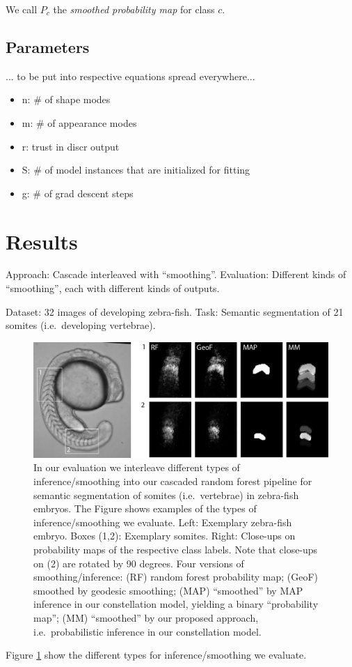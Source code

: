\documentclass[10pt,twocolumn,letterpaper]{article}
\begin{document}
We call $P_c$ the \emph{smoothed probability map} for class $c$. 

\subsection{Parameters}
... to be put into respective equations spread everywhere...
\begin{itemize}
\item n: \# of shape modes
\item m: \# of appearance modes
\item r: trust in discr output
\item S: \# of model instances that are initialized for fitting
\item g: \# of grad descent steps
\end{itemize}

\section{Results}
Approach: Cascade interleaved with "`smoothing"'. 
Evaluation: Different kinds of "`smoothing"', each with different kinds of outputs.

Dataset: 32 images of developing zebra-fish. Task: Semantic segmentation of 21 somites (i.e.\ developing vertebrae).

\begin{figure}[t]
\begin{center}
\includegraphics[width=\columnwidth]{smoothing.jpg} %
\caption{In our evaluation we interleave different types of inference/smoothing into our cascaded random forest pipeline for semantic segmentation of somites (i.e.\ vertebrae) in zebra-fish embryos. 
%
The Figure shows examples of the types of inference/smoothing we evaluate. 
Left: Exemplary zebra-fish embryo. Boxes (1,2): Exemplary somites. Right: Close-ups on probability maps of the respective class labels. Note that close-ups on (2) are rotated by 90 degrees. 
%
Four versions of smoothing/inference: (RF) random forest probability map; (GeoF) smoothed by geodesic smoothing\cite{GeoF2013}; (MAP) "`smoothed"' by MAP inference in our constellation model, yielding a binary "`probability map"'; 
%
(MM) "`smoothed"' by our proposed approach, i.e.\ probabilistic inference in our constellation model.  }
\label{fig:smoothing}
\end{center}
\end{figure}
%
Figure \ref{fig:smoothing} show the different types for inference/smoothing we evaluate. 
\end{document}

